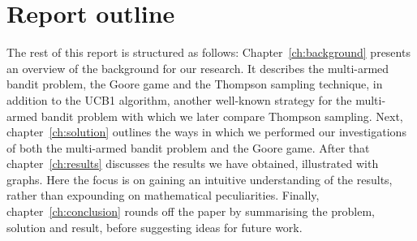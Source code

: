 \section{Report outline}
The rest of this report is structured as follows: Chapter~\ref{ch:background} presents an overview of the background for our research.
It describes the multi-armed bandit problem, the Goore game and the Thompson sampling technique, in addition to the UCB1 algorithm, another well-known strategy for the multi-armed bandit problem with which we later compare Thompson sampling.
Next, chapter~\ref{ch:solution} outlines the ways in which we performed our investigations of both the multi-armed bandit problem and the Goore game.
After that chapter~\ref{ch:results} discusses the results we have obtained, illustrated with graphs.
Here the focus is on gaining an intuitive understanding of the results, rather than expounding on mathematical peculiarities.
Finally, chapter~\ref{ch:conclusion} rounds off the paper by summarising the problem, solution and result, before suggesting ideas for future work.
